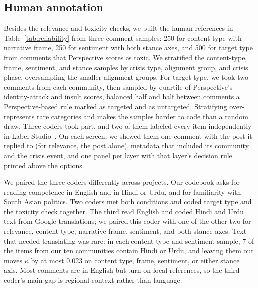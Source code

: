\subsection{Human annotation}
\label{sec:data-coders}

Besides the relevance and toxicity checks, we built the human references in Table~\ref{tab:reliability} from three comment samples: 250 for content type with narrative frame, 250 for sentiment with both stance axes, and 500 for target type from comments that Perspective scores as toxic. We stratified the content-type, frame, sentiment, and stance samples by crisis type, alignment group, and crisis phase, oversampling the smaller alignment groups. For target type, we took two comments from each community, then sampled by quartile of Perspective's identity-attack and insult scores, balanced half and half between comments a Perspective-based rule marked as targeted and as untargeted. Stratifying over-represents rare categories and makes the samples harder to code than a random draw. Three coders took part, and two of them labeled every item independently in Label Studio~\cite{tkachenko2020labelstudio}. On each screen, we showed them one comment with the post it replied to (for relevance, the post alone), metadata that included its community and the crisis event, and one panel per layer with that layer's decision rule printed above the options. 


We paired the three coders differently across projects. Our codebook asks for reading competence in English and in Hindi or Urdu, and for familiarity with South Asian politics. Two coders met both conditions and coded target type and the toxicity check together. The third read English and coded Hindi and Urdu text from Google translations; we paired this coder with one of the other two for relevance, content type, narrative frame, sentiment, and both stance axes. Text that needed translating was rare: in each content-type and sentiment sample, 7 of the items from our ten communities contain Hindi or Urdu, and leaving them out moves $\kappa$ by at most 0.023 on content type, frame, sentiment, or either stance axis. Most comments are in English but turn on local references, so the third coder's main gap is regional context rather than language. 




